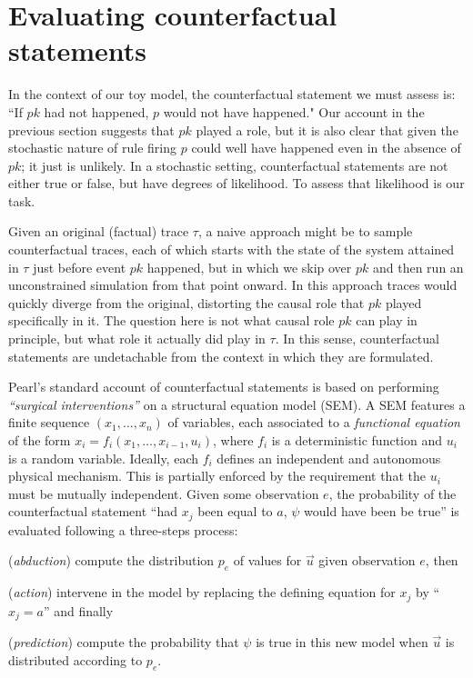
\newcommand{\PCFST}[0]{\ProbParen{\CFST{}}}

\newcommand{\ItAbduction}[0]{(\textit{abduction})}
\newcommand{\ItAction}[0]{(\textit{action})}
\newcommand{\ItPrediction}[0]{(\textit{prediction})}


\section{Evaluating counterfactual
  statements}\label{sec:counterfactual}

In the context of our toy model, the counterfactual statement we must
assess is: ``If $pk$ had not happened, $p$ would not have happened."
Our account in the previous section suggests that $pk$ played a role,
but it is also clear that given the stochastic nature of rule firing
$p$ could well have happened even in the absence of $pk$; it just is
unlikely. In a stochastic setting, counterfactual statements are not
either true or false, but have degrees of likelihood. To assess that
likelihood is our task.

Given an original (factual) trace $\tau$, a naive approach might be to
sample counterfactual traces, each of which starts with the state of
the system attained in $\tau$ just before event $pk$ happened, but in
which we skip over $pk$ and then run an unconstrained simulation from
that point onward. In this approach traces would quickly diverge from
the original, distorting the causal role that $pk$ played specifically
in it. The question here is not what causal role $pk$ can play in
principle, but what role it actually did play in $\tau$. In this
sense, counterfactual statements are undetachable from the context in
which they are formulated.

Pearl's standard account of counterfactual statements
\cite{pearl2009causality} is based on performing \textit{``surgical
  interventions''} on a structural equation model (SEM). A SEM
features a finite sequence $(x_1, \dots, x_n)$ of variables, each
associated to a \emph{functional equation} of the form
$x_i = f_i(x_1, \dots, x_{i-1}, u_i)$, where $f_i$ is a deterministic
function and $u_i$ is a random variable. Ideally, each $f_i$ defines
an independent and autonomous physical mechanism. This is partially
enforced by the requirement that the $u_i$ must be mutually
independent. Given some observation $e$, the probability of the
counterfactual statement ``had $x_j$ been equal to $a$, $\psi$ would
have been be true'' is evaluated following a three-steps process:
\begin{inparaenum}[]
\item \ItAbduction{} compute the distribution $p_e$ of values for
  $\vec u$ given observation $e$, then
\item \ItAction{} intervene in the model by replacing the defining
  equation for $x_j$ by ``$x_j = a$'' and finally
\item \ItPrediction{} compute the probability that $\psi$ is true in
  this new model when $\vec{u}$ is distributed according to $p_e$.
\end{inparaenum}

